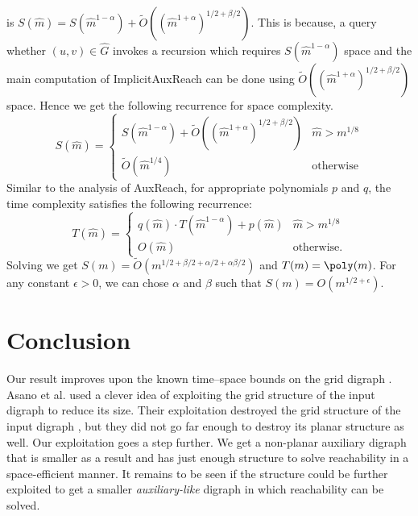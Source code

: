 \documentclass[11pt]{article}
\numberwithin{equation}{section}
\theoremstyle{definition}
\theoremstyle{plain}
\begin{document}
%
is   %
$S(\widehat{m}) = S(\widehat{m}^{1-\alpha}) + \widetilde{O}((\widehat{m}^{1+\alpha})^{1/2 + \beta/2})$. This is because, a query whether $(u,v) \in \widehat{G}$%
invokes  %
a recursion which %
requires  %
$S(\widehat{m}^{1-\alpha})$ space and the main computation of \textsf{ImplicitAuxReach} %
can  %
be done using $\widetilde{O}((\widehat{m}^{1+\alpha})^{1/2 + \beta/2})$ space. Hence we get the following recurrence for space complexity.
\[S(\widehat{m}) =
\begin{cases}
S(\widehat{m}^{1 - \alpha}) + \widetilde{O}((\widehat{m}^{1+\alpha})^{1/2 + \beta/2}) & \widehat{m} > m^{1/8} \\
\widetilde{O}(\widehat{m}^{1/4}) & \textrm{otherwise}
\end{cases}\]
Similar to the analysis of \textsf{AuxReach}, for appropriate polynomials $p$ and $q$, the time complexity %
satisfies  %
the following recurrence:
\[T(\widehat{m}) = \begin{cases}
q (\widehat{m}) \cdot T(\widehat{m}^{1 - \alpha}) + p(\widehat{m}) & \widehat{m} > m^{1/8} \\
O(\widehat{m}) & \textrm{otherwise}.
\end{cases}\]
Solving we get $S(m) = \widetilde{O}(m^{1/2 + \beta/2 + \alpha/2 + \alpha\beta/2})$ and $T(m) = \poly(m)$. For any constant $\epsilon>0$, we can chose $\alpha$ and $\beta$ such that $S(m) = {O}(m^{1/2 + \epsilon})$.


\section{Conclusion}
Our result improves upon the known time--space bounds on the grid %
digraph %
. Asano et al. \cite{Asano} used a clever idea of exploiting the grid structure of the input %
digraph %
to reduce its size. Their exploitation destroyed the grid structure of the input
digraph %
, but they did not go far enough to destroy its planar structure as well. Our exploitation goes a step further. We get a non-planar auxiliary %
digraph %
 that is smaller as a result and has just enough structure to solve reachability in a space-efficient manner. It remains to be seen if the structure could be further exploited to get a smaller \emph{auxiliary-like} %
digraph %
 in which reachability can be solved.
\end{document}

